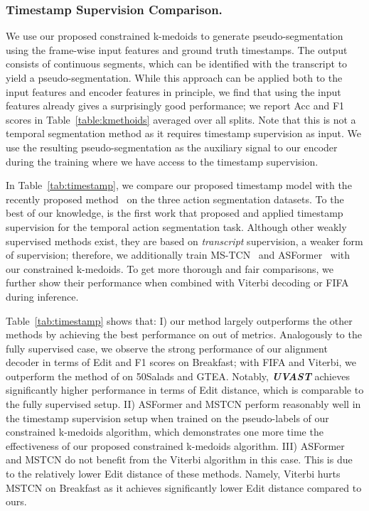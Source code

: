 \subsubsection{Timestamp Supervision Comparison.}
We use our proposed constrained k-medoids to generate pseudo-segmentation using the frame-wise input features and ground truth timestamps. The output consists of continuous segments, which can be identified with the transcript to yield a pseudo-segmentation. While this approach can be applied both to the input features and encoder features in principle, we find that using the input features already gives a surprisingly good performance; we report Acc and F1 scores in Table~\ref{table:kmethoids} averaged over all splits. Note that this is not a temporal segmentation method as it requires timestamp supervision as input. We use the resulting pseudo-segmentation as the auxiliary signal to our encoder during the training where we have access to the timestamp supervision. 

In Table~\ref{tab:timestamp}, we compare our proposed timestamp model with the recently proposed method~\cite{timestamp2021} on the three action segmentation datasets.
To the best of our knowledge, \cite{timestamp2021} is the first work that proposed and applied timestamp supervision for the temporal action segmentation task. 
Although other weakly supervised methods exist, they are based on \textit{transcript} supervision, a weaker form of supervision; 
therefore, we additionally train MS-TCN~\cite{farha2019ms} and ASFormer~\cite{asformer} with our constrained k-medoids. To get more thorough and fair comparisons, we further show their performance when combined with Viterbi decoding or FIFA during inference.  

Table~\ref{tab:timestamp} shows that: I) our  method largely outperforms the other methods by achieving the best performance on  out of  metrics.
Analogously to the fully supervised case, we observe the strong performance of our alignment decoder in terms of Edit and F1 scores on Breakfast; with FIFA and Viterbi, we outperform the method of \cite{timestamp2021} on 50Salads and GTEA. Notably, \textbf{\textit{UVAST}} achieves significantly higher performance in terms of Edit distance, which is comparable to the fully supervised setup. II) ASFormer and MSTCN perform reasonably well in the timestamp supervision setup when trained on the pseudo-labels of our constrained k-medoids algorithm, which demonstrates one more time the effectiveness of our proposed constrained k-medoids algorithm. III) ASFormer and MSTCN do not benefit from the Viterbi algorithm in this case. This is due to the relatively lower Edit distance of these methods. Namely, Viterbi hurts MSTCN on Breakfast as it achieves significantly lower Edit distance compared to ours.


